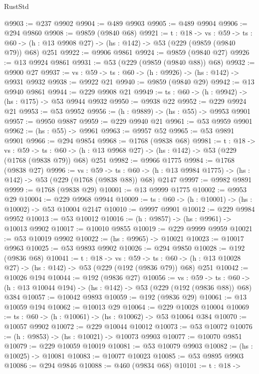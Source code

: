 \begin{lexlean}{RustStd}
\begin{coremodule}
@9903 := @237 @9902
@9904 := @489 @9903
@9905 := @489 @9904
@9906 := @294 @9860
@9908 := @9859 (@9840 @68)
@9921 := {t : @18} ->
  {vs : @59} ->
  {ts : @60} -> (h : @13 @9908 @27) -> (hs : @142) -> @53 (@229 (@9859 (@9840 @79)) @68) @251
@9922 := @9906 @9861
@9924 := @9859 (@9840 @27)
@9926 := @13 @9924 @9861
@9931 := @53 (@229 (@9859 (@9840 @88)) @68)
@9932 := @9900 @27
@9937 := {vs : @59} -> {ts : @60} -> (h : @9926) -> (hs : @142) -> @9931 @9932
@9938 := @9922 @21
@9940 := @9859 (@9840 @29)
@9942 := @13 @9940 @9861
@9944 := @229 @9908 @21
@9949 := {ts : @60} -> (h : @9942) -> (hs : @175) -> @53 @9944 @9932
@9950 := @9938 @22
@9952 := @229 @9924 @21
@9953 := @53 @9952
@9956 := (h : @9889) -> (hs : @55) -> @9953 @9901
@9957 := @9950 @9887
@9959 := @229 @9940 @21
@9961 := @53 @9959 @9901
@9962 := (hs : @55) -> @9961
@9963 := @9957 @52
@9965 := @53 @9891 @9901
@9966 := @294 @9854
@9968 := @1768 (@9838 @68)
@9981 := {t : @18} ->
  {vs : @59} ->
  {ts : @60} -> (h : @13 @9968 @27) -> (hs : @142) -> @53 (@229 (@1768 (@9838 @79)) @68) @251
@9982 := @9966 @1775
@9984 := @1768 (@9838 @27)
@9996 := {vs : @59} ->
  {ts : @60} -> (h : @13 @9984 @1775) -> (hs : @142) -> @53 (@229 (@1768 (@9838 @88)) @68) @2147
@9997 := @9982 @9891
@9999 := @1768 (@9838 @29)
@10001 := @13 @9999 @1775
@10002 := @9953 @29
@10004 := @229 @9968 @9944
@10009 := {ts : @60} -> (h : @10001) -> (hs : @10002) -> @53 @10004 @2147
@10010 := @9997 @9901
@10012 := @229 @9984 @9952
@10013 := @53 @10012
@10016 := (h : @9857) -> (hs : @9961) -> @10013 @9902
@10017 := @10010 @9855
@10019 := @229 @9999 @9959
@10021 := @53 @10019 @9902
@10022 := (hs : @9965) -> @10021
@10023 := @10017 @9963
@10025 := @53 @9893 @9902
@10026 := @294 @9850
@10028 := @192 (@9836 @68)
@10041 := {t : @18} ->
  {vs : @59} ->
  {ts : @60} -> (h : @13 @10028 @27) -> (hs : @142) -> @53 (@229 (@192 (@9836 @79)) @68) @251
@10042 := @10026 @194
@10044 := @192 (@9836 @27)
@10056 := {vs : @59} ->
  {ts : @60} -> (h : @13 @10044 @194) -> (hs : @142) -> @53 (@229 (@192 (@9836 @88)) @68) @384
@10057 := @10042 @9893
@10059 := @192 (@9836 @29)
@10061 := @13 @10059 @194
@10062 := @10013 @29
@10064 := @229 @10028 @10004
@10069 := {ts : @60} -> (h : @10061) -> (hs : @10062) -> @53 @10064 @384
@10070 := @10057 @9902
@10072 := @229 @10044 @10012
@10073 := @53 @10072
@10076 := (h : @9853) -> (hs : @10021) -> @10073 @9903
@10077 := @10070 @9851
@10079 := @229 @10059 @10019
@10081 := @53 @10079 @9903
@10082 := (hs : @10025) -> @10081
@10083 := @10077 @10023
@10085 := @53 @9895 @9903
@10086 := @294 @9846
@10088 := @460 (@9834 @68)
@10101 := {t : @18} ->

\end{coremodule}
\end{lexlean}
